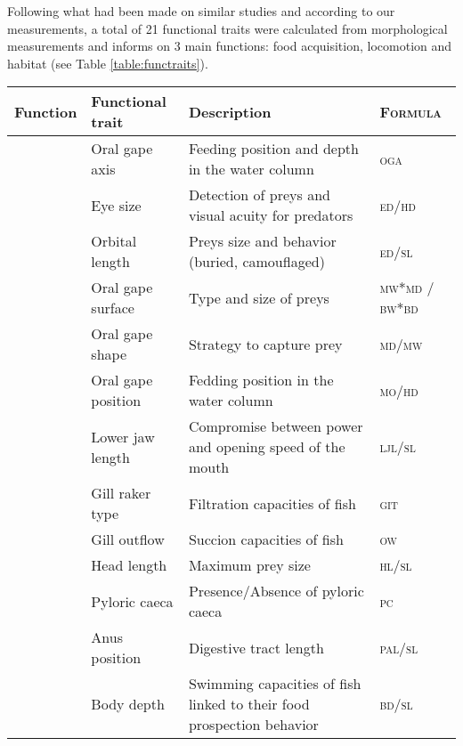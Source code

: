Following what had been made on similar studies and according to our measurements, a total of 21 functional traits were calculated from morphological measurements and informs on 3 main functions: food acquisition, locomotion and habitat (see Table \ref{table:functraits}).

\begin{sidewaystable}
\centering
\caption[Functional traits descriptions and formulas]{Description and formulas of the functionals traits computed from morphological measurements, following \citep{albouy2011, aneeshkumar2017,boyle2006,brindamour2016,diderich2006,dumay2004,habib2019,ibanez2007,sibbing2000,webb1984,winemiller1991}. Abbreviations used in formulas are provided by raw measurements and detailed in appendices \ref{fig:full_body}, \ref{fig:head} \& \ref{fig:fin}. \textsc{oga}, \textsc{git}, \textsc{pc}, \textsc{pht} are categorial variables directly provided by raw measurements with first two scores detailed respectively in appendices \ref{fig:git} \& \ref{fig:oga}.}
\label{table:functraits}
\begin{tabular}{>{\bfseries}lll>{\scshape}l}
  \hline
Function & Functional trait & Description & Formula  \\ 
  \hline
\multirow{13}{*}{Feeding} &Oral gape axis & Feeding position and depth in the water column & oga \\ 
  &Eye size & Detection of preys and visual acuity for predators & ed/hd \\ 
  &Orbital length & Preys size and behavior (buried, camouflaged) & ed/sl \\ 
  &Oral gape surface & Type and size of preys & mw*md / bw*bd \\ 
  &Oral gape shape & Strategy to capture prey & md/mw \\ 
  &Oral gape position & Fedding position in the water column & mo/hd \\ 
  &Lower jaw length & Compromise between power and opening speed of the mouth & ljl/sl \\ 
  &Gill raker type & Filtration capacities of fish & git \\ 
  &Gill outflow & Succion capacities of fish & ow \\ 
  &Head length & Maximum prey size & hl/sl \\ 
  &Pyloric caeca & Presence/Absence of pyloric caeca & pc \\ 
  &Anus position & Digestive tract length & pal/sl \\ 
  \hline
  \multirow{6}{*}{Locomotion} & Body depth & Swimming capacities of fish linked to their food prospection behavior & bd/sl \\ 

\end{tabular}
\end{sidewaystable}
